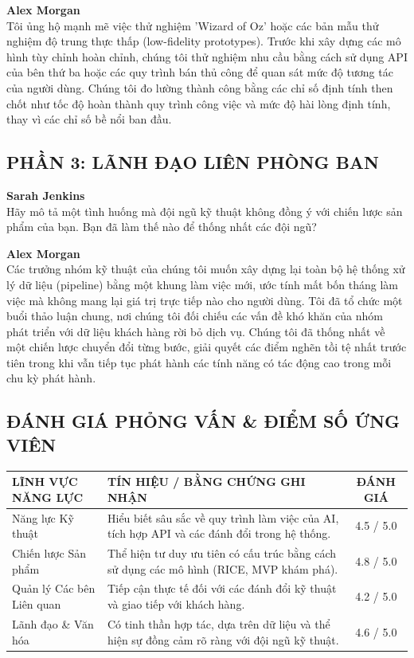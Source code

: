 \documentclass[12pt]{article}
\begin{document}
\vspace{0.5em}
\noindent\textbf{Alex Morgan} \\
Tôi ủng hộ mạnh mẽ việc thử nghiệm 'Wizard of Oz' hoặc các bản mẫu thử nghiệm độ trung thực thấp (low-fidelity prototypes). Trước khi xây dựng các mô hình tùy chỉnh hoàn chỉnh, chúng tôi thử nghiệm nhu cầu bằng cách sử dụng API của bên thứ ba hoặc các quy trình bán thủ công để quan sát mức độ tương tác của người dùng. Chúng tôi đo lường thành công bằng các chỉ số định tính then chốt như tốc độ hoàn thành quy trình công việc và mức độ hài lòng định tính, thay vì các chỉ số bề nổi ban đầu.

\subsection*{PHẦN 3: LÃNH ĐẠO LIÊN PHÒNG BAN}

\noindent\textbf{Sarah Jenkins} \\
Hãy mô tả một tình huống mà đội ngũ kỹ thuật không đồng ý với chiến lược sản phẩm của bạn. Bạn đã làm thế nào để thống nhất các đội ngũ?

\vspace{0.5em}
\noindent\textbf{Alex Morgan} \\
Các trưởng nhóm kỹ thuật của chúng tôi muốn xây dựng lại toàn bộ hệ thống xử lý dữ liệu (pipeline) bằng một khung làm việc mới, ước tính mất bốn tháng làm việc mà không mang lại giá trị trực tiếp nào cho người dùng. Tôi đã tổ chức một buổi thảo luận chung, nơi chúng tôi đối chiếu các vấn đề khó khăn của nhóm phát triển với dữ liệu khách hàng rời bỏ dịch vụ. Chúng tôi đã thống nhất về một chiến lược chuyển đổi từng bước, giải quyết các điểm nghẽn tồi tệ nhất trước tiên trong khi vẫn tiếp tục phát hành các tính năng có tác động cao trong mỗi chu kỳ phát hành.

\subsection*{ĐÁNH GIÁ PHỎNG VẤN \& ĐIỂM SỐ ỨNG VIÊN}

\begin{table}[h!]
\centering
\begin{tabular}{|l|p{8cm}|c|}
\hline
\textbf{LĨNH VỰC NĂNG LỰC} & \textbf{TÍN HIỆU / BẰNG CHỨNG GHI NHẬN} & \textbf{ĐÁNH GIÁ} \\ \hline
Năng lực Kỹ thuật & Hiểu biết sâu sắc về quy trình làm việc của AI, tích hợp API và các đánh đổi trong hệ thống. & 4.5 / 5.0 \\ \hline
Chiến lược Sản phẩm & Thể hiện tư duy ưu tiên có cấu trúc bằng cách sử dụng các mô hình (RICE, MVP khám phá). & 4.8 / 5.0 \\ \hline
Quản lý Các bên Liên quan & Tiếp cận thực tế đối với các đánh đổi kỹ thuật và giao tiếp với khách hàng. & 4.2 / 5.0 \\ \hline
Lãnh đạo \& Văn hóa & Có tinh thần hợp tác, dựa trên dữ liệu và thể hiện sự đồng cảm rõ ràng với đội ngũ kỹ thuật. & 4.6 / 5.0 \\ \hline
\end{tabular}
\end{table}
\end{document}
